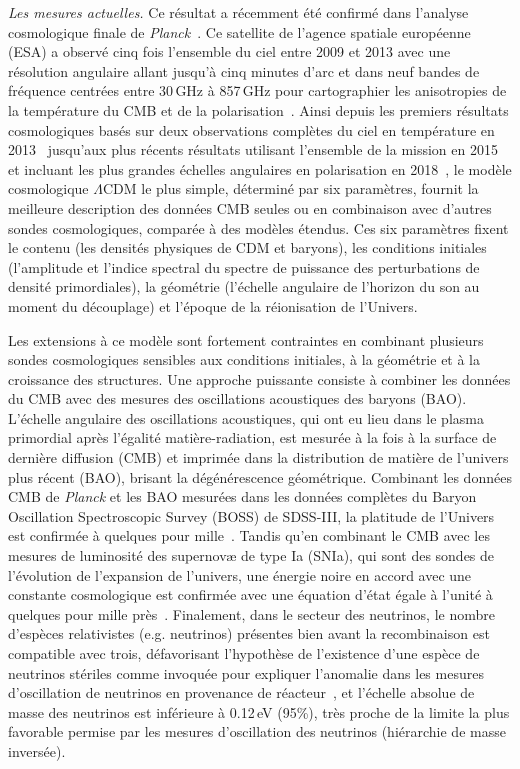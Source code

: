 \emph{Les mesures actuelles.} Ce résultat a récemment été
confirmé dans l'analyse cosmologique finale
de \emph{Planck}~\citep{Planck_2018_cosmo}. Ce satellite de l'agence
spatiale européenne (ESA) a observé cinq fois l'ensemble du ciel entre
2009 et 2013 avec une résolution angulaire allant jusqu'à cinq minutes
d'arc et dans neuf bandes de fréquence centrées entre 30\,GHz à
857\,GHz pour cartographier les anisotropies de la
température du CMB et de la polarisation~\citep{Planck_2013_mission,
Planck_2015_mission, Planck_2018_mission}. Ainsi depuis les premiers
résultats cosmologiques basés sur deux observations complètes du ciel
en température en 2013~\citep{Planck_2013_cosmo} jusqu'aux plus récents
résultats utilisant l'ensemble de la mission en
2015~\citep{Planck_2015_cosmo} et incluant les plus grandes échelles
angulaires en polarisation en 2018~\citep{Planck_2018_cosmo}, le modèle
cosmologique $\Lambda$CDM le plus simple, déterminé par six
paramètres, fournit la meilleure description des données CMB seules ou
en combinaison avec d'autres sondes cosmologiques, comparée à des
modèles étendus. Ces six paramètres fixent le contenu (les densités
physiques de CDM et baryons), les conditions initiales (l'amplitude et
l'indice spectral du spectre de puissance des perturbations de densité
primordiales), la géométrie (l'échelle angulaire de l'horizon du son
au moment du découplage) et l'époque de la réionisation de l'Univers. 

Les extensions à ce modèle sont fortement contraintes en combinant
plusieurs sondes cosmologiques sensibles aux conditions initiales, à
la géométrie et à la croissance des structures. 
Une approche puissante consiste à combiner les données du CMB avec des mesures des
oscillations acoustiques des baryons (BAO). L'échelle angulaire des
oscillations acoustiques, qui ont eu lieu dans
le plasma primordial après l'égalité matière-radiation, est mesurée à
la fois à la surface de dernière diffusion (CMB) et imprimée dans la
distribution de matière de l'univers plus récent (BAO), brisant la
dégénérescence géométrique. Combinant les
données CMB de \emph{Planck} et les BAO mesurées dans les données
complètes du Baryon Oscillation Spectroscopic Survey (BOSS) de
SDSS-III, la platitude de l'Univers est confirmée à quelques pour
mille~\citep{BOSS2017, Planck_2018_cosmo}. Tandis qu'en
combinant le CMB avec les mesures de luminosité des supernovæ de type
Ia (SNIa), qui sont des sondes de l'évolution de l'expansion de
l'univers, une énergie noire en accord avec une constante cosmologique
est confirmée avec une équation d'état égale à l'unité à quelques pour
mille près~\citep{SNLS2014, PANSTARR2018, Planck_2018_cosmo}.
Finalement, dans le secteur des neutrinos, le nombre
d'espèces relativistes (e.g. neutrinos) présentes bien avant la
recombinaison est compatible avec trois, défavorisant l'hypothèse de
l'existence d'une espèce de neutrinos stériles comme invoquée pour expliquer
l'anomalie dans les mesures d'oscillation de neutrinos en provenance
de réacteur~\citep{LSND2001, STEREO2019}, et l'échelle absolue de masse des
neutrinos est inférieure à 0.12\,eV (95\%), très proche de la limite
la plus favorable permise par les mesures d'oscillation des neutrinos
(hiérarchie de masse inversée).\\


